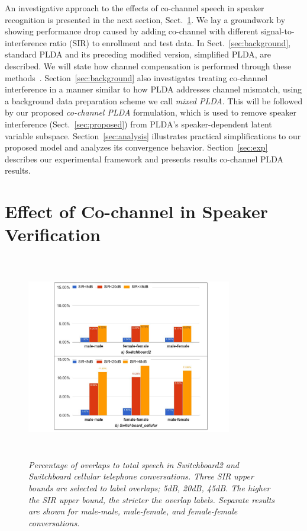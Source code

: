 \documentclass[journal]{IEEEtran}
\begin{document}
An investigative approach to the effects of co-channel speech in speaker recognition is presented in the next section, Sect.~\ref{sec:cochannl_in_sid}. We lay a groundwork by showing performance drop caused by adding co-channel with different signal-to-interference ratio (SIR) to enrollment and test data. 
In Sect.~\ref{sec:background}, standard PLDA and its preceding modified version, simplified PLDA, are described. We will state how channel compensation is performed through these methods~\cite{prince_plda,kenny_plda}. 
Section~\ref{sec:background} also investigates treating co-channel interference in a manner similar to how PLDA addresses channel mismatch, using a background data preparation scheme we call {\it mixed PLDA}. 
This will be followed by our proposed {\it co-channel PLDA} formulation, which is used to remove speaker interference (Sect.~\ref{sec:proposed}) from PLDA's speaker-dependent latent variable subspace. 
Section~\ref{sec:analysis} illustrates practical simplifications to our proposed model and analyzes its convergence behavior. 
Section~\ref{sec:exp} describes our experimental framework and presents results co-channel PLDA results. 

\section{Effect of Co-channel in Speaker Verification}
\label{sec:cochannl_in_sid}

\begin{figure}[t!]
	\centering
	\vspace{0mm}
	\includegraphics[height = 3.5in, width=0.8\textwidth]{figures/swb_overlap_percentage-crop}
	\vspace{-1mm}
	\caption{\it \small Percentage of overlaps to total speech in Switchboard2 and Switchboard cellular telephone conversations. Three SIR upper bounds are selected to label overlaps; 5dB, 20dB, 45dB. The higher the SIR upper bound, the stricter the overlap labels. Separate results are shown for male-male, male-female, and female-female conversations.}
	\label{fig:swb_overlap_percentage}
	\vspace{-3mm}
\end{figure}
\end{document}
